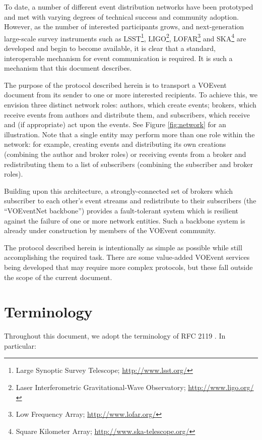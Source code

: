 \documentclass[a4paper,11pt]{ivoa}
\begin{document}
To date, a number of different event distribution networks have been
prototyped and met with varying degrees of technical success and community
adoption. However, as the number of interested participants grows, and
next-generation large-scale survey instruments such as LSST\footnote{Large
Synoptic Survey Telescope; \url{http://www.lsst.org/}}, LIGO\footnote{Laser
Interferometric Gravitational-Wave Observatory; \url{http://www.ligo.org/}},
LOFAR\footnote{Low Frequency Array; \url{http://www.lofar.org/}} and
SKA\footnote{Square Kilometer Array; \url{http://www.ska-telescope.org/}} are
developed and begin to become available, it is clear that a standard,
interoperable mechanism for event communication is required. It is such a
mechanism that this document describes.

The purpose of the protocol described herein is to transport a VOEvent
document from its sender to one or more interested recipients. To achieve
this, we envision three distinct network roles: authors, which create events;
brokers, which receive events from authors and distribute them, and
subscribers, which receive and (if appropriate) act upon the events. See
Figure \ref{fig:network} for an illustration. Note that a single entity may
perform more than one role within the network: for example, creating events
and distributing its own creations (combining the author and broker roles) or
receiving events from a broker and redistributing them to a list of
subscribers (combining the subscriber and broker roles).

Building upon this architecture, a strongly-connected set of brokers which
subscriber to each other's event streams and redistribute to their subscribers
(the ``VOEventNet backbone'') provides a fault-tolerant system which is
resilient against the failure of one or more network entities. Such a backbone
system is already under construction by members of the VOEvent community.

The protocol described herein is intentionally as simple as possible while
still accomplishing the required task. There are some value-added VOEvent
services being developed that may require more complex protocols, but these
fall outside the scope of the current document.

\section{Terminology}

Throughout this document, we adopt the terminology of RFC 2119
\citep{Bradner:1997}. In particular:
\end{document}
